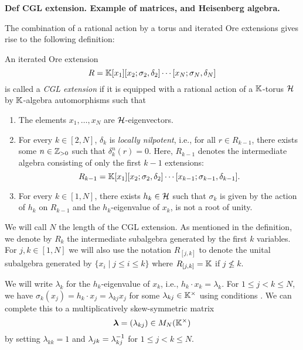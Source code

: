 \textbf{Def CGL extension. Example of matrices, and Heisenberg algebra.}

The combination of a rational action by a torus and iterated Ore extensions gives rise
to the following definition:
\begin{definition}\label{def:cgl_extension}
	An iterated Ore extension
	\begin{equation*}
		R = \mathbb{K}[x_1][x_2; \sigma_2, \delta_2]\cdots [x_N; \sigma_N, \delta_N]
	\end{equation*}
	is called a \emph{CGL extension} if it is equipped with a rational action of a $\mathbb{K}$-torus $\mathcal{H}$ by $\mathbb{K}$-algebra automorphisms such that
	\begin{enumerate}
		\item\label{itm:x_i-eigenvectors} The elements $x_1, \dots, x_N$ are $\mathcal{H}$-eigenvectors.
		\item For every $k\in [2, N]$, $\delta_k$ is \emph{locally
			      nilpotent}, i.e., for all $r \in R_{k-1}$, there exists some
		      $n \in \mathbb{Z}_{>0}$ such that $\delta_k^n (r) = 0$. Here, $R_{k-1}$ denotes the
		      intermediate algebra consisting of only the first $k-1$ extensions:
		      \begin{equation*}
			      R_{k-1} = \mathbb{K}[x_1][x_2; \sigma_2, \delta_2]\cdots[x_{k-1};\sigma_{k-1}, \delta_{k-1}].
		      \end{equation*}
		      \item\label{itm:sigma_k-is-h_k} For every $k \in [1, N]$, there exists $h_k \in \mathcal{H}$ such that $\sigma_k$ is given by the action of $h_k$ on $R_{k-1}$ and the $h_k$-eigenvalue of $x_k$, is not a root of unity.
	\end{enumerate}
\end{definition}

We will call $N$ the length of the CGL extension. As
mentioned in the definition, we denote by $R_k$ the intermediate subalgebra generated
by the first $k$ variables. For $j, k \in [1, N]$ we will also use the notation $R_{[j,
					k]}$ to denote the unital subalgebra generated by $\{x_i \mid j \leq i \leq k\}$ where
$R_{[j, k]} = \mathbb{K}$ if $j \nleq k$.

We will write $\lambda_k$ for the $h_k$-eigenvalue of $x_k$, i.e., $h_k \cdot x_k =
	\lambda_k$. For $1 \leq j < k \leq N$, we have $\sigma_k (x_j) = h_k \cdot x_j =
	\lambda_{kj} x_j$ for some $\lambda_{kj} \in \mathbb{K}^\times$ using conditions
. We can complete this to a
multiplicatively skew-symmetric matrix
\begin{equation}\label{eq:CGL_lambda}
	\boldsymbol{\lambda}= (\lambda_{kj}) \in M_N(\mathbb{K}^\times)
\end{equation}
%
by setting $\lambda_{kk} = 1$ and $\lambda_{jk} = \lambda_{kj}^{-1}$ for $1 \leq j < k
	\leq N$.

